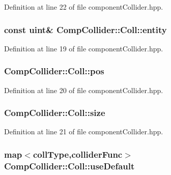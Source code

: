 Definition at line 22 of file component\-Collider.\-hpp.

\hypertarget{struct_comp_collider_1_1_coll_a8b70833ba1f9195107ce2cb4c1153121}{
\subsubsection[{entity}]{\setlength{\rightskip}{0pt plus 5cm}const {\bf uint}\& Comp\-Collider\-::\-Coll\-::entity}}\label{struct_comp_collider_1_1_coll_a8b70833ba1f9195107ce2cb4c1153121}


Definition at line 19 of file component\-Collider.\-hpp.

\hypertarget{struct_comp_collider_1_1_coll_aa029c22c889d38a61d16822e31a59ed7}{
\subsubsection[{pos}]{ Comp\-Collider\-::\-Coll\-::pos}}\label{struct_comp_collider_1_1_coll_aa029c22c889d38a61d16822e31a59ed7}


Definition at line 20 of file component\-Collider.\-hpp.

\hypertarget{struct_comp_collider_1_1_coll_a3ab6e568d387b8ff25d4bf2086b1eb7a}{
\subsubsection[{size}]{ Comp\-Collider\-::\-Coll\-::size}}\label{struct_comp_collider_1_1_coll_a3ab6e568d387b8ff25d4bf2086b1eb7a}


Definition at line 21 of file component\-Collider.\-hpp.

\hypertarget{struct_comp_collider_1_1_coll_a39408a6e8ee1ec2f6cc2f19245172fab}{
\subsubsection[{use\-Default}]{\setlength{\rightskip}{0pt plus 5cm}map$<${\bf coll\-Type},{\bf collider\-Func}$>$ Comp\-Collider\-::\-Coll\-::use\-Default}}\label{struct_comp_collider_1_1_coll_a39408a6e8ee1ec2f6cc2f19245172fab}


